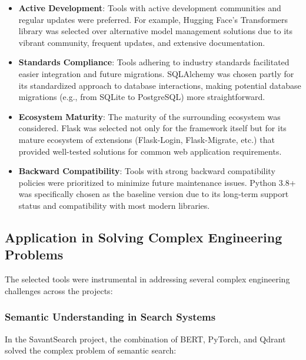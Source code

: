 \documentclass[12pt,a4paper]{article}
\begin{document}
\begin{itemize}
    \item \textbf{Active Development}: Tools with active development communities and regular updates were preferred. For example, Hugging Face's Transformers library was selected over alternative model management solutions due to its vibrant community, frequent updates, and extensive documentation.
    
    \item \textbf{Standards Compliance}: Tools adhering to industry standards facilitated easier integration and future migrations. SQLAlchemy was chosen partly for its standardized approach to database interactions, making potential database migrations (e.g., from SQLite to PostgreSQL) more straightforward.
    
    \item \textbf{Ecosystem Maturity}: The maturity of the surrounding ecosystem was considered. Flask was selected not only for the framework itself but for its mature ecosystem of extensions (Flask-Login, Flask-Migrate, etc.) that provided well-tested solutions for common web application requirements.
    
    \item \textbf{Backward Compatibility}: Tools with strong backward compatibility policies were prioritized to minimize future maintenance issues. Python 3.8+ was specifically chosen as the baseline version due to its long-term support status and compatibility with most modern libraries.
\end{itemize}

\subsection{Application in Solving Complex Engineering Problems}

The selected tools were instrumental in addressing several complex engineering challenges across the projects:

\subsubsection{Semantic Understanding in Search Systems}
In the SavantSearch project, the combination of BERT, PyTorch, and Qdrant solved the complex problem of semantic search:
\end{document}
